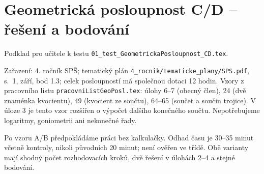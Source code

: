 \documentclass[a4paper,10pt]{article}
\begin{document}
\section*{Geometrická posloupnost C/D -- řešení a bodování}
Podklad pro učitele k testu
\texttt{01\_test\_GeometrickaPosloupnost\_CD.tex}.

Zařazení: 4. ročník SPŠ; tematický plán
\texttt{4\_rocnik/tematicke\_plany/SPS.pdf}, s.~1, září, bod 1.3;
celek posloupností má společnou dotaci 12 hodin.
Vzory z pracovního listu \texttt{pracovniListGeoPosl.tex}:
úlohy 6--7 (obecný člen), 24 (dvě znaménka kvocientu),
49 (kvocient ze součtu), 64--65 (součet a součin trojice).
V úloze 3 je tento vzor rozšířen o výpočet dalšího konečného součtu.
Nepotřebujeme logaritmy, goniometrii ani nekonečné řady.

Po vzoru A/B předpokládáme práci bez kalkulačky.
Odhad času je 30--35 minut včetně kontroly, nikoli původních 20 minut;
není ověřen ve třídě. Obě varianty mají shodný počet rozhodovacích kroků,
dvě řešení v úlohách 2--4 a stejné bodování.
\end{document}
